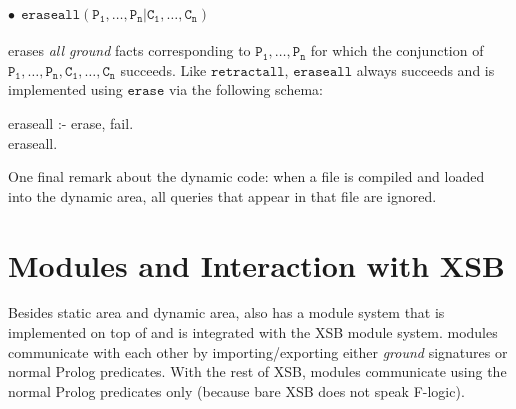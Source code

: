 \documentclass[11pt]{report}
\begin{document}
\paragraph{$\bullet~~\mathtt{eraseall(P_1,\ldots,P_n | C_1,\ldots,C_n)}$} erases \emph{all ground}
facts corresponding to $\mathtt{P_1,\ldots,P_n}$ for which the conjunction
of $\mathtt{P_1,\ldots,P_n,C_1,\ldots,C_n}$ succeeds. Like
$\mathtt{retractall}$, $\mathtt{eraseall}$ always succeeds and is
implemented using $\mathtt{erase}$ via the following schema:
\begin{qrules}
eraseall :- erase, fail. \\
eraseall.
\end{qrules}

One final remark about the dynamic code: when a file is compiled and loaded
into the dynamic area, all queries that appear in that file are ignored.

\section{\FLORA Modules and Interaction with XSB}\label{sec-module}

Besides static area and dynamic area, \FLORA also has a module system that
is implemented on top of and is integrated with the XSB module system.
\FLORA modules communicate with each other by importing/exporting either
\emph{ground} \fl signatures or normal Prolog predicates. With the rest of
XSB, \FLORA modules communicate using the normal Prolog predicates only
(because bare XSB does not speak F-logic).
\end{document}

